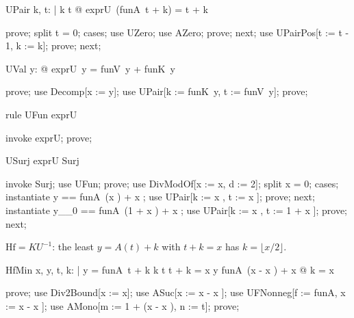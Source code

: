 \documentclass{article}
\begin{document}
\begin{theorem}{UPair}
  \forall k, t: \nat | k \leq t @ exprU~(funA~t + k) = t + k
\end{theorem}

\begin{zproof}
prove;
split t = 0;
cases;
use UZero;
use AZero;
prove;
next;
use UPairPos[t := t - 1, k := k];
prove;
next;
\end{zproof}

\begin{theorem}{UVal}
  \forall y: \nat @ exprU~y = funV~y + funK~y
\end{theorem}

\begin{zproof}
prove;
use Decomp[x := y];
use UPair[k := funK~y, t := funV~y];
prove;
\end{zproof}

\begin{theorem}{rule UFun}
  exprU \in \nat \fun \nat
\end{theorem}

\begin{zproof}
invoke exprU;
prove;
\end{zproof}

\begin{theorem}{USurj}
  exprU \in Surj
\end{theorem}

\begin{zproof}
invoke Surj;
use UFun;
prove;
use DivModOf[x := x, d := 2];
split x  = 0;
cases;
instantiate y == funA~(x ) + x ;
use UPair[k := x , t := x ];
prove;
next;
instantiate y\_\_0 == funA~(1 + x ) + x ;
use UPair[k := x , t := 1 + x ];
prove;
next;
\end{zproof}

$\mathrm{Hf} = K U^{-1}$: the least $y = A(t) + k$ with $t + k = x$ has $k = \lfloor x/2 \rfloor$.

\begin{theorem}{HfMin}
  \forall x, y, t, k: \nat | y = funA~t + k \land k \leq t \land t + k = x \land y \leq funA~(x - x ) + x  @ k = x 
\end{theorem}

\begin{zproof}
prove;
use Div2Bound[x := x];
use ASuc[x := x - x ];
use UFNonneg[f := funA, x := x - x ];
use AMono[m := 1 + (x - x ), n := t];
prove;
\end{zproof}
\end{document}
